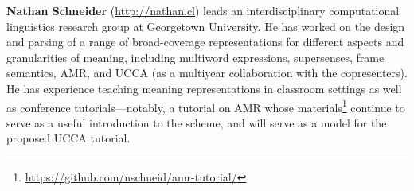 \documentclass[11pt,a4paper,table]{article}
\begin{document}
\textbf{Nathan Schneider} (\url{http://nathan.cl})
leads an interdisciplinary computational linguistics research group at Georgetown University. 
He has worked on the design and parsing of a range of broad-coverage representations for different aspects and granularities of meaning, including multiword expressions, supersenses, frame semantics, AMR, and UCCA (as a multiyear collaboration with the copresenters). 
He has experience teaching meaning representations in classroom settings as well as conference tutorials---notably, a tutorial on AMR \citep{amrtutorial} whose materials\footnote{\url{https://github.com/nschneid/amr-tutorial/}} continue to serve as a useful introduction to the scheme, 
and will serve as a model for the proposed UCCA tutorial.



\end{document}
